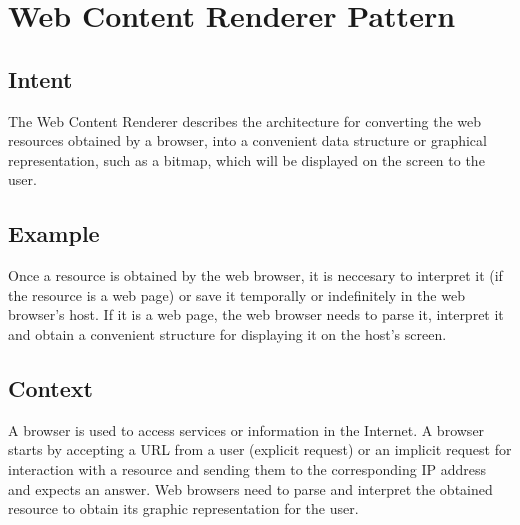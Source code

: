 \documentclass[prodmode,acmtecs]{acmsmall}
\begin{document}
\section{Web Content Renderer Pattern}

  \subsection*{Intent}

  The Web Content Renderer describes the architecture for converting the web resources obtained by a browser, into a convenient data structure \cite{gpuchrome} or graphical representation, such as a bitmap, which will be displayed on the screen to the user.

  \subsection*{Example}
  Once a resource is obtained by the web browser, it is neccesary to interpret it (if the resource is a web page) or save it temporally or indefinitely in the web browser's host. If it is a web page, the web browser needs to parse it, interpret it and obtain a convenient structure for displaying it on the host's screen.
  
  \subsection*{Context}
  A browser is used to access services or information in the Internet. A browser starts by accepting a URL from a user (explicit request) or an implicit request for interaction with a resource and sending them to the corresponding IP address and expects an answer. Web browsers need to parse and interpret the obtained resource to obtain its graphic representation for the user.
\end{document}
